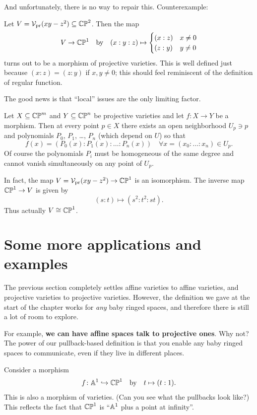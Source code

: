 And unfortunately, there is no way to repair this.
Counterexample:
\begin{example}
	Let $V = \mathcal V_{\text{pr}}(xy-z^2) \subseteq \mathbb{CP}^2$.
	Then the map
	\[
		V \to \mathbb{CP}^1
		\quad\text{by}\quad
		(x:y:z)
		\mapsto
		\begin{cases}
			(x:z) & x \neq 0 \\
			(z:y) & y \neq 0
		\end{cases}
	\]
	turns out to be a morphism of projective varieties.
	This is well defined just because $(x:z) = (z:y)$ if $x,y \neq 0$;
	this should feel reminiscent of the definition of regular function.
\end{example}
The good news is that ``local'' issues are the only limiting factor.
\begin{theorem}
	Let $X \subseteq \mathbb{CP}^m$ and $Y \subseteq \mathbb{CP}^n$ be projective varieties
	and let $f \colon  X \to Y$ be a morphism.
	Then at every point $p \in X$ there exists
	an open neighborhood $U_p \ni p$
	and polynomials $P_0$, $P_1$, \dots, $P_n$ (which depend on $U$) so that
	\[ f(x) = \left( P_0(x) : P_1(x) : \dots : P_n(x) \right)
		\quad \forall x = (x_0 : \dots : x_n) \in U_p. \]
	Of course the polynomials $P_i$ must be homogeneous of the same degree
	and cannot vanish simultaneously on any point of $U_p$.
\end{theorem}
\begin{example}
	In fact, the map $V = \mathcal V_{\text{pr}}(xy-z^2) \to \mathbb{CP}^1$ is an isomorphism.
	The inverse map $\mathbb{CP}^1 \to V$ is given by
	\[ (s:t) \mapsto (s^2:t^2:st). \]
	Thus actually $V \cong \mathbb{CP}^1$.
\end{example}

\section{Some more applications and examples}
The previous section completely settles affine varieties to affine varieties,
and projective varieties to projective varieties.
However, the definition we gave at the start of the chapter
works for \emph{any} baby ringed spaces,
and therefore there is still a lot of room to explore.

For example, \textbf{we can have affine spaces talk to projective ones}.
Why not?
The power of our pullback-based definition
is that you enable any baby ringed spaces to communicate,
even if they live in different places.
\begin{example}
	Consider a morphism
	\[ f \colon \mathbb A^1 \hookrightarrow \mathbb{CP}^1 \quad\text{by}\quad t \mapsto (t:1).  \]
	This is also a morphism of varieties.
	(Can you see what the pullbacks look like?)
	This reflects the fact that $\mathbb{CP}^1$ is ``$\mathbb A^1$ plus a point at infinity''.
\end{example}

